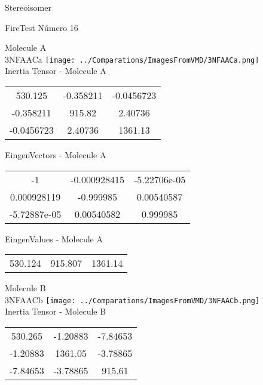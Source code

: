 \begin{center}
\vtab
\vtab
\textcolor{NavyBlue}{\Large Stereoisomer}
\end{center}

 \newpage

\vtab[-2cm]
\begin{center}
{\large FireTest \tab Número 16}
\end{center}
\begin{multicols}{2}
\begin{center}

Molecule A \\ 
3NFAACa
\texttt{[image: ../Comparations/ImagesFromVMD/3NFAACa.png]}
\\
Inertia Tensor - Molecule A \\
\vtab

\begin{tabular}{|c c c|}
530.125	 & 	-0.358211	 & 	-0.0456723	 \\
-0.358211	 & 	915.82	 & 	2.40736	 \\
-0.0456723	 & 	2.40736	 & 	1361.13
\end{tabular}

\vtab
 EingenVectors - Molecule A     \\
\vtab
\begin{tabular}{|c c c|}
-1	 & 	-0.000928415	 & 	-5.22706e-05	 \\
0.000928119	 & 	-0.999985	 & 	0.00540587	 \\
-5.72887e-05	 & 	0.00540582	 & 	0.999985
\end{tabular}

\vtab
 EingenValues - Molecule A     \\
\vtab
\begin{tabular}{|c c c|}
530.124	 & 	915.807	 & 	1361.14	 \\
\end{tabular}
\columnbreak

Molecule B \\ 
3NFAACb
\texttt{[image: ../Comparations/ImagesFromVMD/3NFAACb.png]}
\\
Inertia Tensor - Molecule B \\
\vtab

\begin{tabular}{|c c c|}
530.265	 & 	-1.20883	 & 	-7.84653	 \\
-1.20883	 & 	1361.05	 & 	-3.78865	 \\
-7.84653	 & 	-3.78865	 & 	915.61
\end{tabular}


\end{center}
\end{multicols}
